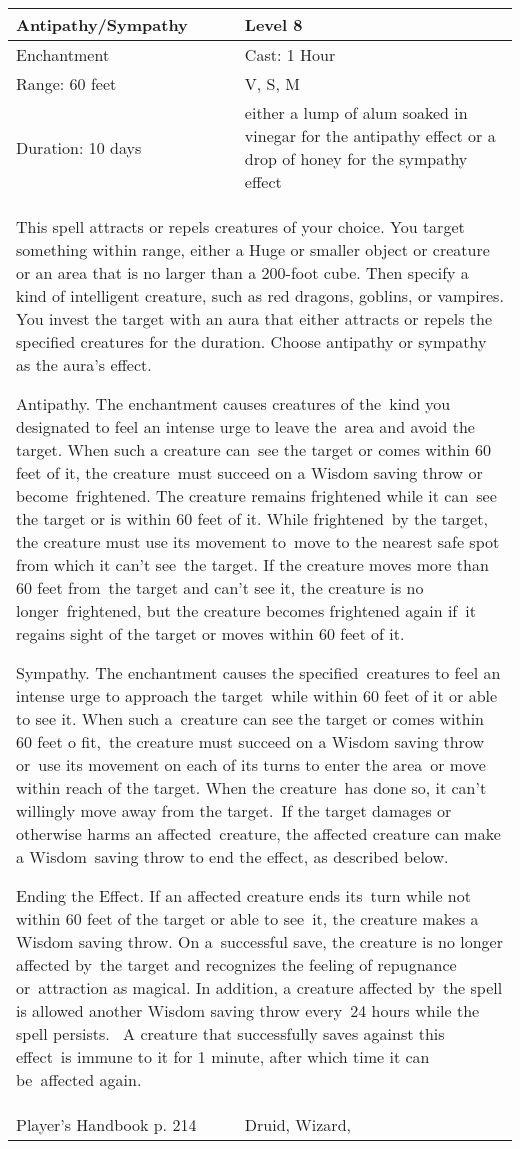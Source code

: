 \documentclass[11pt]{report}
\begin{document}
\begin{table}[H]
	\begin{tabular}{||p{6cm}|p{6cm}||}
		\hline\hline
		\bf{Antipathy/Sympathy} & Level 8\\ \hline
		Enchantment & Cast: 1 Hour\\ \hline
		Range: 60 feet & V, S, M\\ \hline
		Duration: 10 days & either a lump of alum soaked in vinegar for the antipathy effect or a drop of honey for the sympathy effect\\ \hline
		\multicolumn{2}{||p{12cm}||}{This spell attracts or repels creatures of your choice. 
You target something within range, either a Huge or smaller object or creature or an area that is no larger than a 200-foot cube. Then specify a kind of intelligent creature, such as red dragons, goblins, or vampires. You invest the target with an aura that either attracts or repels the specified creatures for the duration. Choose antipathy or sympathy as the aura’s effect. 

Antipathy. 
The enchantment causes creatures of the kind you designated to feel an intense urge to leave the area and avoid the target. When such a creature can see the target or comes within 60 feet of it, the creature must succeed on a Wisdom saving throw or become frightened. The creature remains frightened while it can see the target or is within 60 feet of it. While frightened by the target, the creature must use its movement to move to the nearest safe spot from which it can’t see the target. If the creature moves more than 60 feet from the target and can’t see it, the creature is no longer frightened, but the creature becomes frightened again if it regains sight of the target or moves within 60 feet of it. 

Sympathy. 
The enchantment causes the specified creatures to feel an intense urge to approach the target while within 60 feet of it or able to see it. When such a creature can see the target or comes within 60 feet o fit, the creature must succeed on a Wisdom saving throw or use its movement on each of its turns to enter the area or move within reach of the target. When the creature has done so, it can’t willingly move away from the target. If the target damages or otherwise harms an affected creature, the affected creature can make a Wisdom saving throw to end the effect, as described below. 

Ending the Effect. 
If an affected creature ends its turn while not within 60 feet of the target or able to see it, the creature makes a Wisdom saving throw. On a successful save, the creature is no longer affected by the target and recognizes the feeling of repugnance or attraction as magical. In addition, a creature affected by the spell is allowed another Wisdom saving throw every 24 hours while the spell persists. 
A creature that successfully saves against this effect is immune to it for 1 minute, after which time it can be affected again.}\\ \hline
Player's Handbook p. 214 & Druid, Wizard, \\ \hline\hline
	\end{tabular}
\end{table}
\end{document}
